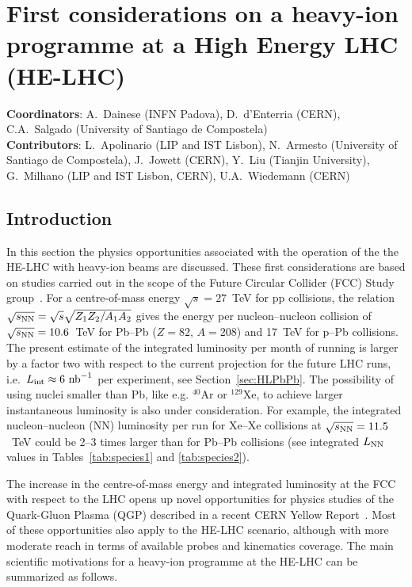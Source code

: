 \documentclass[../report.tex]{subfiles}
\begin{document}
\section{First considerations on a heavy-ion programme at a High Energy LHC (HE-LHC)}
\label{sec:HELHC}

\textbf{Coordinators}: A.~Dainese (INFN Padova), D.~d'Enterria (CERN), C.A.~Salgado (University of Santiago de Compostela)\\
\textbf{Contributors}: L.~Apolinario (LIP and IST Lisbon), N.~Armesto (University of Santiago de Compostela), J.~Jowett (CERN), Y.~Liu (Tianjin University), G.~Milhano (LIP and IST Lisbon, CERN), U.A.~Wiedemann (CERN)

\subsection{Introduction}
\label{sec:HELHC_intro}

In this section the physics opportunities associated with the operation of the the HE-LHC with heavy-ion beams are discussed.
These first considerations are based on studies carried out in the scope of the Future Circular Collider (FCC) Study group~\cite{Dainese:2016gch,FCC-CDR}.
For a centre-of-mass energy $\sqrt{s}= 27$~TeV for pp collisions, the relation $\sqrt{s_{\rm NN}}= \sqrt {s} \sqrt{Z_1 Z_2 / A_1 A_2}$ 
gives the energy per nucleon--nucleon collision of $\sqrt{s_{\rm NN}} = 10.6$~TeV for Pb--Pb ($Z=82$, $A=208$) and 17~TeV for p--Pb collisions. 
The present estimate of the integrated luminosity per month of running is larger by a factor two with respect to the current projection for the future 
LHC runs, i.e.\, $L_{\rm int}\approx 6~{\rm nb}^{-1}$ per experiment, see Section~\ref{sec:HLPbPb}. 
The possibility of using nuclei smaller than Pb, like e.g. $^{40}$Ar or $^{129}$Xe, to achieve larger instantaneous luminosity is also under consideration. 
For example, the integrated nucleon--nucleon (NN) luminosity per run 
for Xe--Xe collisions at $\sqrt{s_{\rm NN}}= 11.5$~TeV could be 2--3 times larger than for Pb--Pb collisions (see integrated $L_{\rm NN}$ values in Tables~\ref{tab:species1} and \ref{tab:species2}).

The increase in the centre-of-mass energy and integrated luminosity at the FCC with respect to the LHC opens up novel opportunities for physics studies of the Quark-Gluon Plasma (QGP) described in a recent CERN Yellow Report~\cite{Dainese:2016gch}. Most of these opportunities also apply to the HE-LHC scenario, although 
with more moderate reach in terms of available probes and kinematics coverage.
The main scientific motivations for a heavy-ion programme at the HE-LHC can be summarized as follows.
\end{document}
